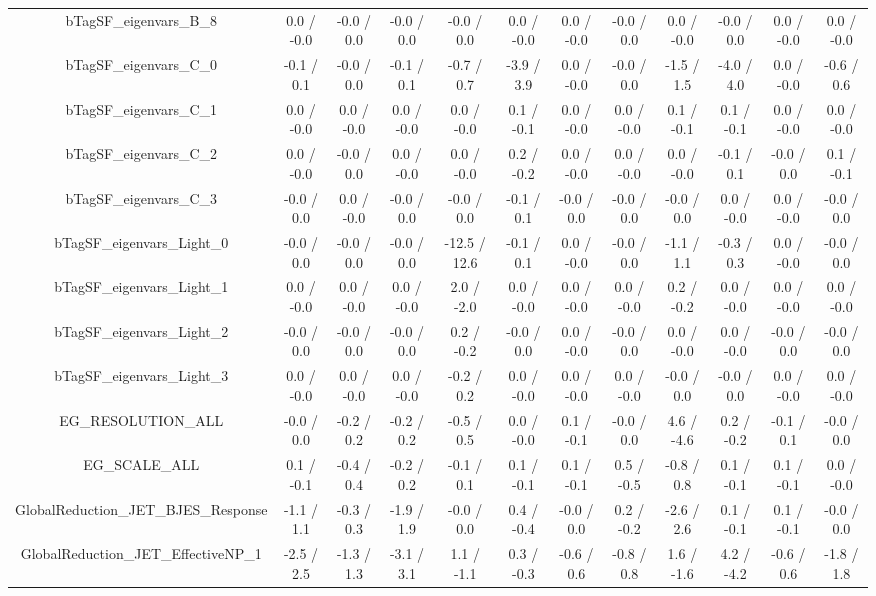 \begin{table}[htbp]
\begin{center}
\begin{tabular}{|c|c|c|c|c|c|c|c|c|c|c|c|}
  bTagSF_eigenvars_B_8 & 0.0 / -0.0 & -0.0 / 0.0 & -0.0 / 0.0 & -0.0 / 0.0 & 0.0 / -0.0 & 0.0 / -0.0 & -0.0 / 0.0 & 0.0 / -0.0 & -0.0 / 0.0 & 0.0 / -0.0 & 0.0 / -0.0 \\ 
  bTagSF_eigenvars_C_0 & -0.1 / 0.1 & -0.0 / 0.0 & -0.1 / 0.1 & -0.7 / 0.7 & -3.9 / 3.9 & 0.0 / -0.0 & -0.0 / 0.0 & -1.5 / 1.5 & -4.0 / 4.0 & 0.0 / -0.0 & -0.6 / 0.6 \\ 
  bTagSF_eigenvars_C_1 & 0.0 / -0.0 & 0.0 / -0.0 & 0.0 / -0.0 & 0.0 / -0.0 & 0.1 / -0.1 & 0.0 / -0.0 & 0.0 / -0.0 & 0.1 / -0.1 & 0.1 / -0.1 & 0.0 / -0.0 & 0.0 / -0.0 \\ 
  bTagSF_eigenvars_C_2 & 0.0 / -0.0 & -0.0 / 0.0 & 0.0 / -0.0 & 0.0 / -0.0 & 0.2 / -0.2 & 0.0 / -0.0 & 0.0 / -0.0 & 0.0 / -0.0 & -0.1 / 0.1 & -0.0 / 0.0 & 0.1 / -0.1 \\ 
  bTagSF_eigenvars_C_3 & -0.0 / 0.0 & 0.0 / -0.0 & -0.0 / 0.0 & -0.0 / 0.0 & -0.1 / 0.1 & -0.0 / 0.0 & -0.0 / 0.0 & -0.0 / 0.0 & 0.0 / -0.0 & 0.0 / -0.0 & -0.0 / 0.0 \\ 
  bTagSF_eigenvars_Light_0 & -0.0 / 0.0 & -0.0 / 0.0 & -0.0 / 0.0 & -12.5 / 12.6 & -0.1 / 0.1 & 0.0 / -0.0 & -0.0 / 0.0 & -1.1 / 1.1 & -0.3 / 0.3 & 0.0 / -0.0 & -0.0 / 0.0 \\ 
  bTagSF_eigenvars_Light_1 & 0.0 / -0.0 & 0.0 / -0.0 & 0.0 / -0.0 & 2.0 / -2.0 & 0.0 / -0.0 & 0.0 / -0.0 & 0.0 / -0.0 & 0.2 / -0.2 & 0.0 / -0.0 & 0.0 / -0.0 & 0.0 / -0.0 \\ 
  bTagSF_eigenvars_Light_2 & -0.0 / 0.0 & -0.0 / 0.0 & -0.0 / 0.0 & 0.2 / -0.2 & -0.0 / 0.0 & 0.0 / -0.0 & -0.0 / 0.0 & 0.0 / -0.0 & 0.0 / -0.0 & -0.0 / 0.0 & -0.0 / 0.0 \\ 
  bTagSF_eigenvars_Light_3 & 0.0 / -0.0 & 0.0 / -0.0 & 0.0 / -0.0 & -0.2 / 0.2 & 0.0 / -0.0 & 0.0 / -0.0 & 0.0 / -0.0 & -0.0 / 0.0 & -0.0 / 0.0 & 0.0 / -0.0 & 0.0 / -0.0 \\ 
  EG_RESOLUTION_ALL & -0.0 / 0.0 & -0.2 / 0.2 & -0.2 / 0.2 & -0.5 / 0.5 & 0.0 / -0.0 & 0.1 / -0.1 & -0.0 / 0.0 & 4.6 / -4.6 & 0.2 / -0.2 & -0.1 / 0.1 & -0.0 / 0.0 \\ 
  EG_SCALE_ALL & 0.1 / -0.1 & -0.4 / 0.4 & -0.2 / 0.2 & -0.1 / 0.1 & 0.1 / -0.1 & 0.1 / -0.1 & 0.5 / -0.5 & -0.8 / 0.8 & 0.1 / -0.1 & 0.1 / -0.1 & 0.0 / -0.0 \\ 
  GlobalReduction_JET_BJES_Response & -1.1 / 1.1 & -0.3 / 0.3 & -1.9 / 1.9 & -0.0 / 0.0 & 0.4 / -0.4 & -0.0 / 0.0 & 0.2 / -0.2 & -2.6 / 2.6 & 0.1 / -0.1 & 0.1 / -0.1 & -0.0 / 0.0 \\ 
  GlobalReduction_JET_EffectiveNP_1 & -2.5 / 2.5 & -1.3 / 1.3 & -3.1 / 3.1 & 1.1 / -1.1 & 0.3 / -0.3 & -0.6 / 0.6 & -0.8 / 0.8 & 1.6 / -1.6 & 4.2 / -4.2 & -0.6 / 0.6 & -1.8 / 1.8 \\ 

\end{tabular}
\end{center}
\end{table}
